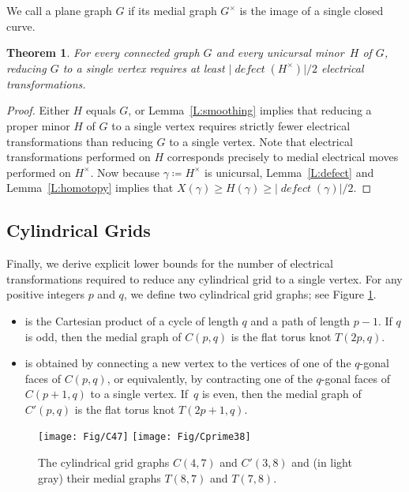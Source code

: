 \documentclass[11pt,twoside]{article}
\def\abs#1{\mathopen| #1 \mathclose|}		%
\def\Defect{\operatorname{\mathit{defect}}}
\let\EDIT\relax
\newtheorem{theorem}{Theorem}[section]
\numberwithin{figure}{section}
\begin{document}
We call a plane graph $G$  if its medial graph $G^\times$ is the image of a single closed curve.

\begin{theorem}
\label{Th:lowerbound}
For every connected \EDIT{plane} graph $G$ and every unicursal minor~$H$ of $G$, reducing $G$ to a single vertex requires at least $\abs{\Defect(H^\times)}/2$ \EDIT{facial} electrical transformations. 
\end{theorem}

\begin{proof}
Either $H$ equals $G$, or Lemma~\ref{L:smoothing} implies that reducing a proper minor $H$ of $G$ to a single vertex requires strictly fewer \EDIT{facial} electrical transformations than reducing $G$ to a single vertex.  Note that \EDIT{facial} electrical transformations performed on $H$ corresponds precisely to medial electrical moves performed on $H^\times$.  Now because $γ \coloneqq H^\times$ is unicursal, Lemma~\ref{L:defect} and Lemma~\ref{L:homotopy} implies that $X(γ) ≥ H(γ) ≥ \abs{\Defect(\gamma)}/2$.
\end{proof}

\subsection{Cylindrical Grids}

Finally, we derive explicit lower bounds for the number of \EDIT{facial} electrical transformations required to reduce any cylindrical grid to a single vertex.  For any positive integers $p$ and $q$, we define two cylindrical grid graphs; see Figure \ref{F:cylinders}.
\begin{itemize}
\item
{} is the Cartesian product of a cycle of length $q$ and a path of length $p-1$.  If $q$ is odd, then the medial graph of $C(p,q)$ is the flat torus knot $T(2p, q)$.

\item
{} is obtained by connecting a new vertex to the vertices of one of the $q$-gonal faces of $C(p,q)$, or equivalently, by contracting one of the $q$-gonal faces of $C(p+1,q)$ to a single vertex.  If~$q$ is even, then the medial graph of $C'(p,q)$ is the flat torus knot $T(2p+1, q)$.
\end{itemize}
\unskip

\begin{figure}[ht]
\centering
\hfil
\texttt{[image: Fig/C47]}\hfil
\texttt{[image: Fig/Cprime38]}\hfil{}
\caption{The cylindrical grid graphs $C(4,7)$ and $C'(3,8)$ and (in light gray) their medial graphs $T(8,7)$ and $T(7,8)$.}
\label{F:cylinders}
\end{figure}
\end{document}
